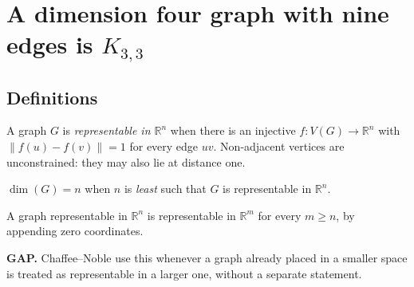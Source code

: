 %
%

\chapter{A dimension four graph with nine edges is \texorpdfstring{$K_{3,3}$}{K33}}

\section{Definitions}

\begin{definition}
  \label{def:representable}
  \leanok
  A graph $G$ is \emph{representable in $\mathbb{R}^n$} when there is an injective
  $f : V(G) \to \mathbb{R}^n$ with $\lVert f(u) - f(v)\rVert = 1$ for every edge $uv$.
  Non-adjacent vertices are unconstrained: they may also lie at distance one.
\end{definition}

\begin{definition}[Dimension]
  \label{def:dimension}
  \leanok
  $\dim(G) = n$ when $n$ is \emph{least} such that $G$ is representable in $\mathbb{R}^n$.
\end{definition}

\begin{lemma}
  \label{lem:fin-le}
  \leanok
  A graph representable in $\mathbb{R}^n$ is representable in $\mathbb{R}^m$ for every $m \ge n$,
  by appending zero coordinates.

  \textbf{GAP.} Chaffee--Noble use this whenever a graph already placed in a smaller space is
  treated as representable in a larger one, without a separate statement.
\end{lemma}

